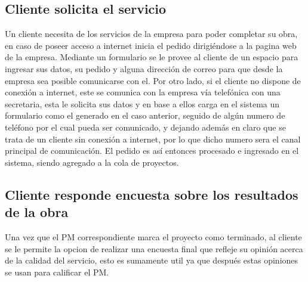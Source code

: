 \documentclass{article}
\theoremstyle{definition}
\theoremstyle{remark}
\begin{document}


\subsection{Cliente solicita el servicio}

Un cliente necesita de los servicios de la empresa para poder completar su obra, en caso de poseer acceso a internet inicia el pedido dirigiéndose a la pagina web de la empresa. Mediante un formulario se le provee al cliente de un espacio para ingresar sus datos, su pedido y alguna dirección de correo para que desde la empresa sea posible comunicarse con el. Por otro lado, si el cliente no dispone de conexión a internet, este se comunica con la empresa vía telefónica con una secretaria, esta le solicita sus datos y en base a ellos carga en el sistema un formulario como el generado en el caso anterior, seguido de algún numero de teléfono por el cual pueda ser comunicado, y dejando además en claro que se trata de un cliente sin conexión a internet, por lo que dicho numero sera el canal principal de comunicación. El pedido es así entonces procesado e ingresado en el sistema, siendo agregado a la cola de proyectos.

\subsection{Cliente responde encuesta sobre los resultados de la obra}

Una vez que el PM correspondiente marca el proyecto como terminado, al cliente se le permite la opcion de realizar una encuesta final que refleje su opinión acerca de la calidad del servicio, esto es sumamente util ya que después estas opiniones se usan para calificar el PM.

\vspace{5px}

\end{document}
